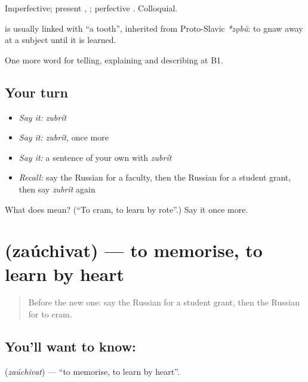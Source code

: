 Imperfective; present \emph{, }; perfective \emph{}. Colloquial.

\begin{cousinweb}
\textbf{} is usually linked with \emph{} \textquotedblleft{}a tooth\textquotedblright{}, inherited from Proto-Slavic \emph{*zǫbŭ}: to gnaw away at a subject until it is learned.
\end{cousinweb}

\begin{grammarlens}[title={What you've built}]
One more word for telling, explaining and describing at B1.
\end{grammarlens}

\subsection*{Your turn}
\begin{itemize}
\raggedright
  \item \emph{Say it:} \emph{zubrít}
  \item \emph{Say it:} \emph{zubrít}, once more
  \item \emph{Say it:} a sentence of your own with \emph{zubrít}
  \item \emph{Recall:} say the Russian for a faculty, then the Russian for a student grant, then say \emph{zubrít} again
\end{itemize}

\begin{tcolorbox}[breakable,colback=teal!4,colframe=teal!35!black,title={Before you move on}]
What does  mean? (\textquotedblleft{}To cram, to learn by rote\textquotedblright{}.) Say it once more.
\end{tcolorbox}
\section[\texorpdfstring{\ru{заучивать} (zaúchivat)}{заучивать (zaúchivat)}]{ (zaúchivat) — to memorise, to learn by heart}

\label{lesson:RU-C384-zauchivat}



\begin{quote}
Before the new one: say the Russian for a student grant, then the Russian for to cram.
\end{quote}

\subsection*{You'll want to know: }
\textbf{} (\emph{zaúchivat}) — \textquotedblleft{}to memorise, to learn by heart\textquotedblright{}.

